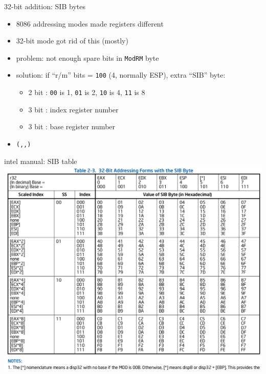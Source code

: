 \begin{frame}{32-bit addition: SIB bytes}
\begin{itemize}
\item 8086 addressing modes made registers different
\item 32-bit mode got rid of this (mostly)
\item problem: not enough spare bits in {\tt ModRM} byte
\item solution: if ``r/m'' bits = {\tt 100} (4, normally ESP), extra ``SIB'' byte:
    \begin{itemize}
    \item 2 bit : {\tt 00} is 1, {\tt 01} is 2, {\tt 10} is 4, {\tt 11} is 8
    \item 3 bit : index register number
    \item 3 bit : base register number
    \end{itemize}
\item {\tt (,,)}
\end{itemize}
\end{frame}

\begin{frame}{intel manual: SIB table}
\includegraphics[height=0.9\textheight]{../x8664-encoding/32bitsib}
\end{frame}

